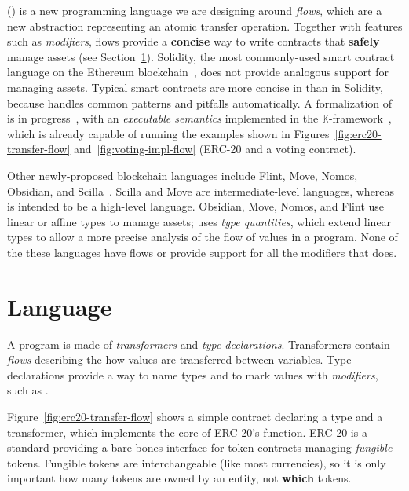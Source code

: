 \documentclass[nonacm, dvipsnames, sigconf]{acmart}
\begin{document}
\langName (\langNamePronounce) is a new programming language we are designing around \emph{flows}, which are a new abstraction representing an atomic transfer operation.
Together with features such as \emph{modifiers}, flows provide a \textbf{concise} way to write contracts that \textbf{safely} manage assets (see Section~\ref{sec:lang}).
Solidity, the most commonly-used smart contract language on the Ethereum blockchain~\cite{EthereumForDevs}, does not provide analogous support for managing assets.
Typical smart contracts are more concise in \langName than in Solidity, because \langName handles common patterns and pitfalls automatically.
A formalization of \langName is in progress~\cite{psamatheRepo}, with an \emph{executable semantics} implemented in the $\mathbb{K}$-framework~\cite{rosu-serbanuta-2010-jlap}, which is already capable of running the examples shown in Figures~\ref{fig:erc20-transfer-flow} and~\ref{fig:voting-impl-flow} (ERC-20 and a voting contract).

Other newly-proposed blockchain languages include Flint, Move, Nomos, Obsidian, and Scilla~\cite{schrans2018flint,blackshear2019move,das2019nomos,coblenz2019obsidian,sergey2019scilla}.
Scilla and Move are intermediate-level languages, whereas \langName is intended to be a high-level language.
Obsidian, Move, Nomos, and Flint use linear or affine types to manage assets; \langName uses \emph{type quantities}, which extend linear types to allow a more precise analysis of the flow of values in a program.
None of the these languages have flows or provide support for all the modifiers that \langName does.

\section{Language}\label{sec:lang}
A \langName program is made of \emph{transformers} and \emph{type declarations}.
Transformers contain \emph{flows} describing the how values are transferred between variables.
Type declarations provide a way to name types and to mark values with \emph{modifiers}, such as .

Figure~\ref{fig:erc20-transfer-flow} shows a simple contract declaring a type and a transformer, which implements the core of ERC-20's  function.
ERC-20 is a standard providing a bare-bones interface for token contracts managing \emph{fungible} tokens.
Fungible tokens are interchangeable (like most currencies), so it is only important how many tokens are owned by an entity, not \textbf{which} tokens.
\end{document}
